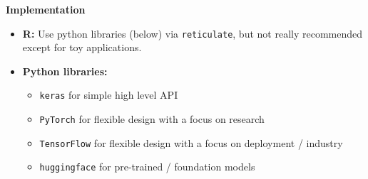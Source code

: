 \documentclass[11pt,compress,t,notes=noshow, xcolor=table]{beamer}
\newcommand{\highlight}[1]{\textcolor{hlcol}{\textbf{#1}}}
\begin{document}
\begin{frame2}
% 
% 
% 
% 
% 

\medskip
 
\highlight{Implementation}

\begin{itemize}
  \item \textbf{R:} Use python libraries (below) via \texttt{reticulate}, but not really recommended except for toy applications.
  \item \textbf{Python libraries:} 
  \begin{itemize}
      \item \texttt{keras} for simple high level API 
      \item \texttt{PyTorch} for flexible design with a focus on research
      \item \texttt{TensorFlow} for flexible design with a focus on deployment / industry
      \item \texttt{huggingface} for pre-trained / foundation models
  \end{itemize}
\end{itemize}
\end{frame2}
\end{document}
